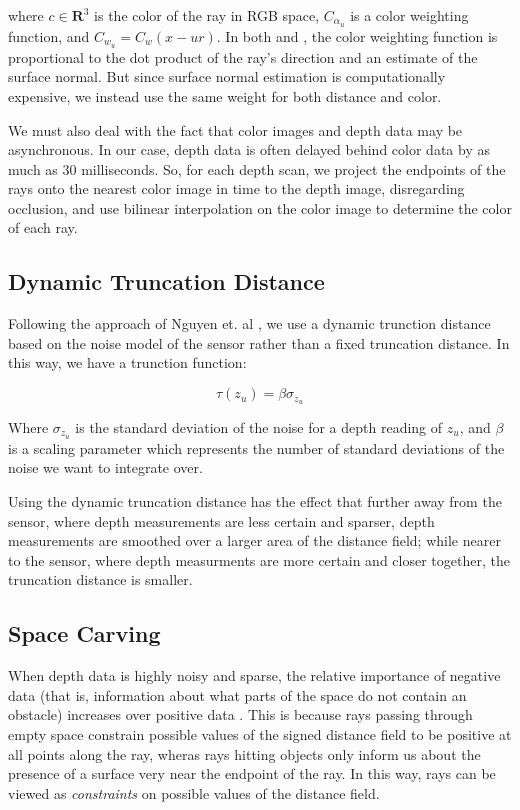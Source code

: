 \documentclass[conference,10pt]{IEEEtran}
\begin{document}
\noindent where $c \in \mathbf{R}^3$ is the color of the ray in RGB space,
$C_{\alpha_u}$ is a color weighting function, and $C_{w_u} = C_w(x - ur)$. In
both \cite{Bylow2013} and \cite{Whelan2013}, the color weighting function is
proportional to the dot product of the ray's direction and an estimate of the
surface normal. But since surface normal estimation is computationally
expensive, we instead use the same weight for both distance and color.

We must also deal with the fact that color images and depth data may be
asynchronous. In our case, depth data is often delayed behind color data by as
much as 30 milliseconds. So, for each depth scan, we project the endpoints of
the rays onto the nearest color image in time to the depth image, disregarding
occlusion, and use bilinear interpolation on the color image to determine the
color of each ray.

\subsection{Dynamic Truncation Distance}
Following the approach of Nguyen et. al \cite{Nguyen2012}, we use a dynamic
trunction distance based on the noise model of the sensor rather than a fixed
truncation distance. In this way, we have a trunction function:

$$ \tau(z_u) = \beta\sigma_{z_u}$$

Where $\sigma_{z_u}$ is the standard deviation of the noise for a depth reading
of $z_u$, and $\beta$ is a scaling parameter which represents the number of
standard deviations of the noise we want to integrate over.

Using the dynamic truncation distance has the effect that further away from the
sensor, where depth measurements are less certain and sparser, depth
measurements are smoothed over a larger area of the distance field; while nearer
to the sensor, where depth measurments are more certain and closer together, the
truncation distance is smaller.

\subsection{Space Carving}
When depth data is highly noisy and sparse, the relative importance of negative
data (that is, information about what parts of the space do not contain an
obstacle) increases over positive data \cite{Klingensmith2014}. This is because
rays passing through empty space constrain possible values of the signed
distance field to be positive at all points along the ray, wheras rays hitting
objects only inform us about the presence of a surface very near the endpoint of
the ray. In this way, rays can be viewed as \textit{constraints} on possible
values of the distance field.
\end{document}

